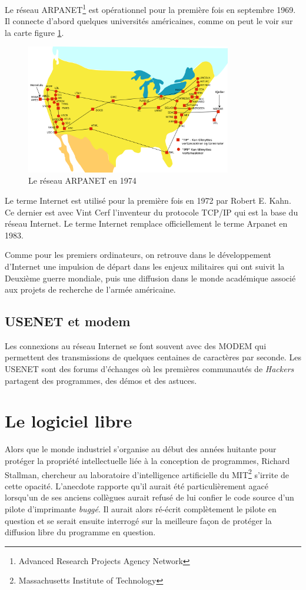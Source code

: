 \documentclass[a4paper,11pt]{book}
\begin{document}
Le réseau ARPANET\footnote{Advanced Research Projects Agency Network} est opérationnel pour la première fois en septembre 1969. Il connecte d'abord quelques universités américaines, comme on peut le voir sur la carte figure \ref{arpanet}.

\begin{figure}[h]
    \centering
    \includegraphics[width=0.8\textwidth]{media/Arpanet_1974.svg.png}
    \caption{Le réseau ARPANET en 1974}
    \label{arpanet}
\end{figure}

Le terme Internet est utilisé pour la première fois en 1972 par Robert E. Kahn. Ce dernier est avec Vint Cerf l'inventeur du protocole TCP/IP qui est la base du réseau Internet. Le terme Internet remplace officiellement le terme Arpanet en 1983.

Comme pour les premiers ordinateurs, on retrouve dans le développement d'Internet une impulsion de départ dans les enjeux militaires qui ont suivit la Deuxième guerre mondiale, puis une diffusion dans le monde académique associé aux projets de recherche de l'armée américaine.

\subsection{USENET et modem}
Les connexions au réseau Internet se font souvent avec des MODEM qui permettent des transmissions de quelques centaines de caractères par seconde. Les USENET sont des forums d'échanges où les premières communautés de \textit{Hackers} partagent des programmes, des démos et des astuces.

\section{Le logiciel libre}
Alors que le monde industriel s'organise au début des années huitante pour protéger la propriété intellectuelle liée à la conception de programmes, Richard Stallman, chercheur au laboratoire d'intelligence artificielle du MIT\footnote{Massachusetts Institute of Technology} s'irrite de cette opacité. L'anecdote rapporte qu'il aurait été particulièrement agacé lorsqu'un de ses anciens collègues aurait refusé de lui confier le code source d'un pilote d'imprimante \textit{buggé}. Il aurait alors ré-écrit complètement le pilote en question et se serait ensuite interrogé sur la meilleure façon de protéger la diffusion libre du programme en question. 
\end{document}
